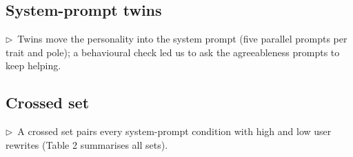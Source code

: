 \documentclass[11pt]{article}
\newcommand{\flow}[1]{\par\noindent\textcolor{blue!60!black}{\small$\triangleright$\ #1}\par\medskip}
\begin{document}
\subsection{System-prompt twins}
\flow{Twins move the personality into the system prompt (five parallel prompts per trait and pole); a behavioural check led us to ask the agreeableness prompts to keep helping.}

\subsection{Crossed set}
\flow{A crossed set pairs every system-prompt condition with high and low user rewrites (Table 2 summarises all sets).}

\end{document}
